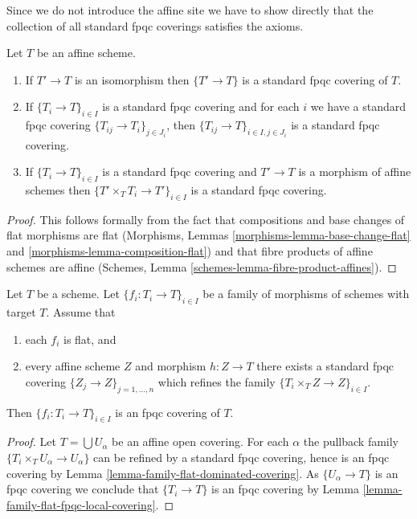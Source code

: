 \noindent
Since we do not introduce the affine site we have to show directly
that the collection of all standard fpqc coverings satisfies the
axioms.

\begin{lemma}
\label{lemma-fpqc-affine-axioms}
Let $T$ be an affine scheme.
\begin{enumerate}
\item If $T' \to T$ is an isomorphism then $\{T' \to T\}$
is a standard fpqc covering of $T$.
\item If $\{T_i \to T\}_{i\in I}$ is a standard fpqc covering and for each
$i$ we have a standard fpqc covering $\{T_{ij} \to T_i\}_{j\in J_i}$, then
$\{T_{ij} \to T\}_{i \in I, j\in J_i}$ is a standard fpqc covering.
\item If $\{T_i \to T\}_{i\in I}$ is a standard fpqc covering
and $T' \to T$ is a morphism of affine schemes then
$\{T' \times_T T_i \to T'\}_{i\in I}$ is a standard fpqc covering.
\end{enumerate}
\end{lemma}

\begin{proof}
This follows formally from the fact that compositions and base changes
of flat morphisms are flat
(Morphisms, Lemmas \ref{morphisms-lemma-base-change-flat} and
\ref{morphisms-lemma-composition-flat})
and that fibre products of affine schemes are affine
(Schemes, Lemma \ref{schemes-lemma-fibre-product-affines}).
\end{proof}

\begin{lemma}
\label{lemma-fpqc-covering-affines-mapping-in}
Let $T$ be a scheme. Let $\{f_i : T_i \to T\}_{i \in I}$ be a family of
morphisms of schemes with target $T$. Assume that
\begin{enumerate}
\item each $f_i$ is flat, and
\item every affine scheme
$Z$ and morphism $h : Z \to T$ there exists a standard fpqc covering
$\{Z_j \to Z\}_{j = 1, \ldots, n}$ which refines the family
$\{T_i \times_T Z \to Z\}_{i \in I}$.
\end{enumerate}
Then $\{f_i : T_i \to T\}_{i \in I}$ is an fpqc covering of $T$.
\end{lemma}

\begin{proof}
Let $T = \bigcup U_\alpha$ be an affine open covering.
For each $\alpha$ the pullback family $\{T_i \times_T U_\alpha \to U_\alpha\}$
can be refined by a standard fpqc covering, hence is an
fpqc covering by Lemma
\ref{lemma-family-flat-dominated-covering}.
As $\{U_\alpha \to T\}$ is an fpqc covering we conclude that
$\{T_i \to T\}$ is an fpqc covering by
Lemma \ref{lemma-family-flat-fpqc-local-covering}.
\end{proof}

